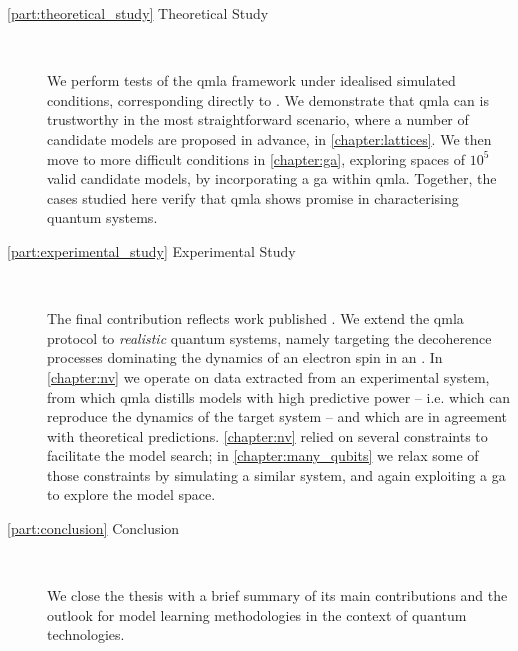 \begin{description}
    
    \item[\cref{part:theoretical_study} Theoretical Study] \
    
        We perform tests of the \gls{qmla} framework under idealised simulated conditions, 
            corresponding directly to \cite{flynn2021Quantum}. 
        We demonstrate that \gls{qmla} can is trustworthy in the most straightforward scenario, 
            where a number of candidate models are proposed in advance, in \cref{chapter:lattices}. 
        We then move to more difficult conditions in \cref{chapter:ga}, 
            exploring spaces of $10^5$ valid candidate models, by incorporating a \gls{ga} within \gls{qmla}. 
        Together, the cases studied here verify that \gls{qmla} shows promise in characterising quantum systems. 
    
    \item[\cref{part:experimental_study} Experimental Study] \

        The final contribution reflects work published \cite{gentile2020learning}.
        We extend the \gls{qmla} protocol to \emph{realistic} quantum systems, namely targeting the decoherence processes dominating the 
        dynamics of an electron spin in an . 
        In \cref{chapter:nv} we operate on data extracted from an experimental system, 
            from which \gls{qmla} distills models with high predictive power -- i.e. which can reproduce the dynamics of the target system -- 
            and which are in agreement with theoretical predictions. 
        \cref{chapter:nv} relied on several constraints to facilitate the model search; 
            in \cref{chapter:many_qubits} we relax some of those constraints by simulating a similar system, 
            and again exploiting a \gls{ga} to explore the model space. 
    
    \item[\cref{part:conclusion} Conclusion] \
    
        We close the thesis with a brief summary of its main contributions and the outlook for 
        model learning methodologies in the context of quantum technologies. 

\end{description}
